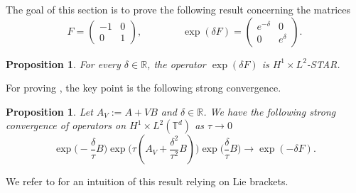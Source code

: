 \documentclass[a4paper]{article}
\theoremstyle{plain}
\newtheorem{proposition}[theorem]{Proposition}
\newcommand{\T}{\mathbb{T}}
\newcommand{\R}{\mathbb{R}}
\begin{document}
The goal of this section is to prove the following result concerning the matrices
\begin{equation} \label{def:F}
    F=\begin{pmatrix}
     -1 & 0 \\ 0 & 1
 \end{pmatrix},
 \qquad \qquad
 \exp(\delta F) =\begin{pmatrix}
     e^{-\delta} & 0 \\ 0 & e^{\delta}
 \end{pmatrix}.
\end{equation}

\begin{proposition} \label{Prop:exp(deltaF)}
    For every $\delta \in \R$, the operator $\exp(\delta F)$ is $H^1 \times L^2$-STAR.
\end{proposition}

For proving , the key point is the following strong convergence.

\begin{proposition} \label{Cor:strongCV_bis}
Let $A_V:=A+VB$ and $\delta \in \R$. We have the following strong convergence of operators on $H^1 \times L^2(\T^d)$ as $\tau \to 0$
\begin{equation} \label{L_tau}
\exp\big(-\frac{\delta}{\tau} B\big) \exp\big( \tau(A_V+\frac{\delta^2}{\tau^2}B) \big) \exp\big(\frac{\delta}{\tau} B\big) \longrightarrow \exp(-\delta F).
\end{equation}
\end{proposition} 

We refer to  for an intuition of this result relying on Lie brackets.
\end{document}
